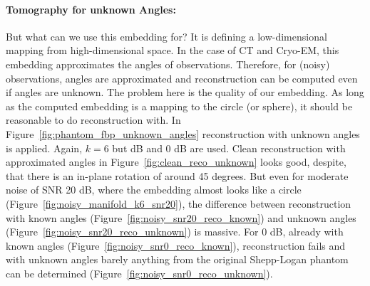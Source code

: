 \paragraph{Tomography for unknown Angles:}
But what can we use this embedding for?
It is defining a low-dimensional mapping from high-dimensional space.
In the case of CT and Cryo-EM, this embedding approximates the angles of observations.
Therefore, for (noisy) observations, angles are approximated and reconstruction can be computed even if angles are unknown.
The problem here is the quality of our embedding. As long as the computed embedding is a mapping to the circle (or sphere),
it should be reasonable to do reconstruction with.
In Figure~\ref{fig:phantom_fbp_unknown_angles} reconstruction with unknown angles is applied. Again, $k=6$
but  dB and 0 dB are used. Clean reconstruction with approximated angles in Figure~\ref{fig:clean_reco_unknown} looks good, 
despite, that there is an in-plane rotation of around 45 degrees. 
But even for moderate noise of SNR 20 dB, where the embedding almost looks like a circle (Figure~\ref{fig:noisy_manifold_k6_snr20}),
the difference between reconstruction with known angles (Figure~\ref{fig:noisy_snr20_reco_known})
and unknown angles (Figure~\ref{fig:noisy_snr20_reco_unknown}) is massive.
For 0 dB, already with known angles (Figure~\ref{fig:noisy_snr0_reco_known}), reconstruction fails and with unknown angles barely anything from
the original Shepp-Logan phantom can be determined  (Figure~\ref{fig:noisy_snr0_reco_unknown}).

